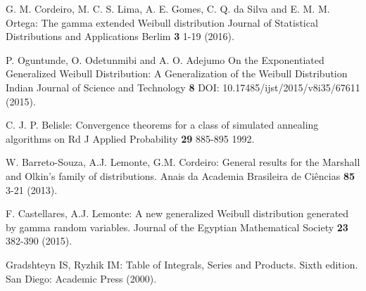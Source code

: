 \documentclass[twoside,leqno,11pt]{article}
\begin{document}
\begin{thebibliography}{8}
\item 
G. M. Cordeiro, M. C. S. Lima, A. E. Gomes, C. Q. da Silva and E. M. M. Ortega: The gamma extended Weibull distribution Journal of Statistical Distributions and Applications Berlim \textbf{3} 1-19 (2016).

\item 
P. Oguntunde, O. Odetunmibi and A. O. Adejumo On the Exponentiated Generalized Weibull Distribution: A Generalization of the Weibull Distribution Indian Journal of Science and Technology \textbf{8} DOI: 10.17485/ijst/2015/v8i35/67611 (2015).

\item C. J. P. Belisle: Convergence theorems for a class of simulated annealing algorithms on Rd J Applied Probability \textbf{29} 885-895 1992.

\item
W. Barreto-Souza, A.J. Lemonte, G.M. Cordeiro:
General results for the Marshall and Olkin's family of distributions.
Anais da Academia Brasileira de Ci\^{e}ncias {\bf 85} 3-21 (2013).

\item
F. Castellares, A.J. Lemonte:
A new generalized Weibull distribution gene\-rated by gamma random variables.
Journal of the Egyptian Mathematical Society {\bf 23} 382-390 (2015).

\item
Gradshteyn IS, Ryzhik IM: Table of Integrals, Series and Products. Sixth edition. San Diego: Academic Press (2000).












\end{thebibliography}
\end{document}
